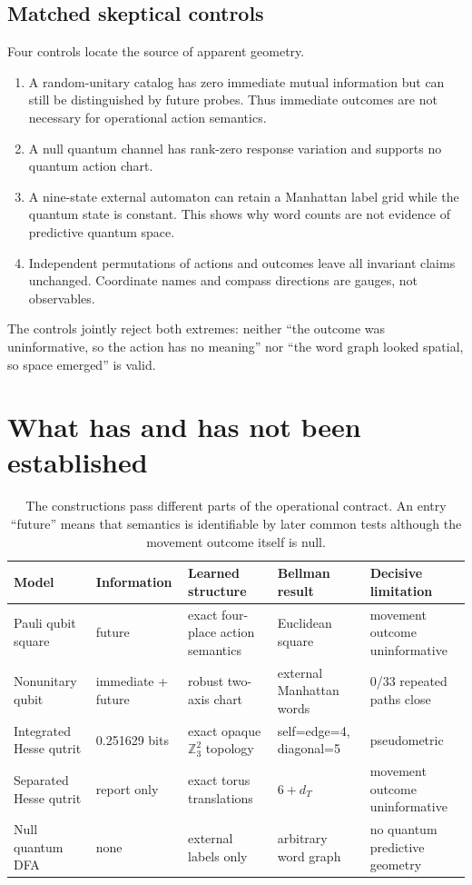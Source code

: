\documentclass[11pt]{article}
\theoremstyle{definition}
\theoremstyle{remark}
\newcommand{\Z}{\mathbb Z}
\begin{document}
\subsection{Matched skeptical controls}

Four controls locate the source of apparent geometry.
\begin{enumerate}
\item A random-unitary catalog has zero immediate mutual information but can
still be distinguished by future probes.  Thus immediate outcomes are not
necessary for operational action semantics.
\item A null quantum channel has rank-zero response variation and supports no
quantum action chart.
\item A nine-state external automaton can retain a Manhattan label grid while
the quantum state is constant.  This shows why word counts are not evidence of
predictive quantum space.
\item Independent permutations of actions and outcomes leave all invariant
claims unchanged.  Coordinate names and compass directions are gauges, not
observables.
\end{enumerate}
The controls jointly reject both extremes: neither ``the outcome was
uninformative, so the action has no meaning'' nor ``the word graph looked
spatial, so space emerged'' is valid.

\section{What has and has not been established}

\begin{table}[H]
\centering
\caption{The constructions pass different parts of the operational contract.
An entry ``future'' means that semantics is identifiable by later common tests
although the movement outcome itself is null.}
\begin{tabularx}{\linewidth}{lXXXX}
\toprule
Model & Information & Learned structure & Bellman result & Decisive limitation\\
\midrule
Pauli qubit square & future & exact four-place action semantics & Euclidean
square & movement outcome uninformative\\
Nonunitary qubit & immediate + future & robust two-axis chart & external
Manhattan words & 0/33 repeated paths close\\
Integrated Hesse qutrit & 0.251629 bits & exact opaque $\Z_3^2$ topology &
self=edge=4, diagonal=5 & pseudometric\\
Separated Hesse qutrit & report only & exact torus translations &
$6+d_T$ & movement outcome uninformative\\
Null quantum DFA & none & external labels only & arbitrary word graph & no
quantum predictive geometry\\
\bottomrule
\end{tabularx}
\end{table}
\end{document}
